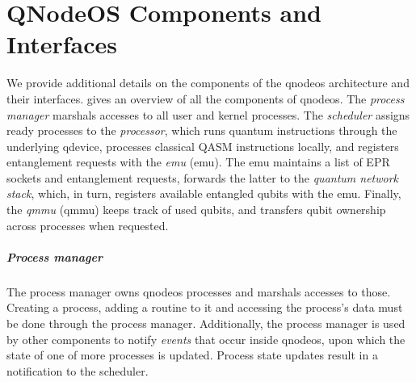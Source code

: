 \chapter{QNodeOS Components and Interfaces}
\label{app:qnodeos}

We provide additional details on the components of the \acrshort{qnodeos} architecture and their
interfaces.  gives an overview of all the components of \acrshort{qnodeos}.
The \emph{process manager} marshals accesses to all user and kernel processes. The \emph{scheduler}
assigns ready processes to the \emph{processor}, which runs quantum instructions through the
underlying \acrshort{qdevice}, processes classical QASM instructions locally, and registers
entanglement requests with the \emph{\acrlong{emu}} (\acrshort{emu}). The \acrshort{emu} maintains a
list of EPR sockets and entanglement requests, forwards the latter to the \emph{quantum network
stack}, which, in turn, registers available entangled qubits with the \acrshort{emu}. Finally, the
\emph{\acrlong{qmmu}} (\acrshort{qmmu}) keeps track of used qubits, and transfers qubit ownership
across processes when requested.

\paragraph{Process manager}

The process manager owns \acrshort{qnodeos} processes and marshals accesses to those. Creating a
process, adding a routine to it and accessing the process's data must be done through the process
manager. Additionally, the process manager is used by other components to notify \emph{events} that
occur inside \acrshort{qnodeos}, upon which the state of one of more processes is updated. Process
state updates result in a notification to the scheduler.

